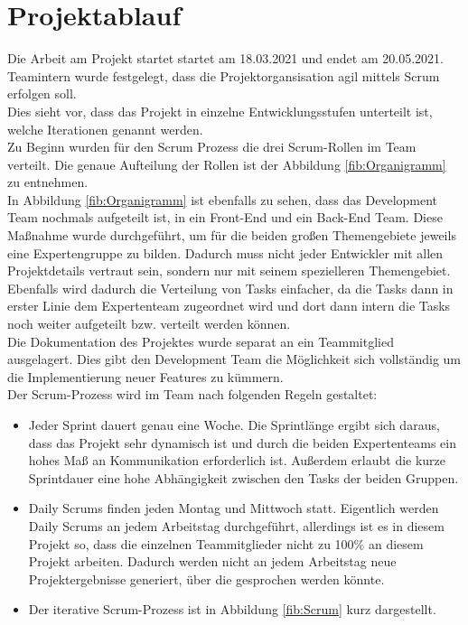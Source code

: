 \section{Projektablauf}
\label{sec:ablauf}
Die Arbeit am Projekt startet startet am 18.03.2021 und endet am 20.05.2021. \\
Teamintern wurde festgelegt, dass die Projektorgansisation agil mittels \gls{Scrum} erfolgen soll.\\
Dies sieht vor, dass das Projekt in einzelne Entwicklungsstufen unterteilt ist, welche Iterationen genannt werden.\\
Zu Beginn wurden für den Scrum Prozess die drei Scrum-Rollen im Team verteilt. Die genaue Aufteilung der Rollen ist der Abbildung \ref{fib:Organigramm} zu entnehmen. \\
In Abbildung \ref{fib:Organigramm} ist ebenfalls zu sehen, dass das \gls{Development Team} nochmals aufgeteilt ist, in ein \gls{Front-End} und ein \gls{Back-End} Team. Diese Maßnahme wurde durchgeführt, um für die beiden großen Themengebiete jeweils eine Expertengruppe zu bilden. Dadurch muss nicht jeder Entwickler mit allen Projektdetails vertraut sein, sondern nur mit seinem spezielleren Themengebiet. Ebenfalls wird dadurch die Verteilung von Tasks einfacher, da die Tasks dann in erster Linie dem Expertenteam zugeordnet wird und dort dann intern die Tasks noch weiter aufgeteilt bzw. verteilt werden können. \\
Die Dokumentation des Projektes wurde separat an ein Teammitglied ausgelagert. Dies gibt den \gls{Development Team} die Möglichkeit sich vollständig um die Implementierung neuer Features zu kümmern.\\
Der Scrum-Prozess wird im Team nach folgenden Regeln gestaltet:
\begin{itemize}
\item Jeder Sprint dauert genau eine Woche. Die Sprintlänge ergibt sich daraus, dass das Projekt sehr dynamisch ist und durch die beiden Expertenteams ein hohes Maß an Kommunikation erforderlich ist. Außerdem erlaubt die kurze Sprintdauer eine hohe Abhängigkeit zwischen den Tasks der beiden Gruppen.
\item \gls{Daily Scrum}s finden jeden Montag und Mittwoch statt. Eigentlich werden \gls{Daily Scrum}s an jedem Arbeitstag durchgeführt, allerdings ist es in diesem Projekt so, dass die einzelnen Teammitglieder nicht zu 100\% an diesem Projekt arbeiten. Dadurch werden nicht an jedem Arbeitstag neue Projektergebnisse generiert, über die gesprochen werden könnte. 
\item Der iterative Scrum-Prozess ist in Abbildung \ref{fib:Scrum} kurz dargestellt.
\end{itemize} 

